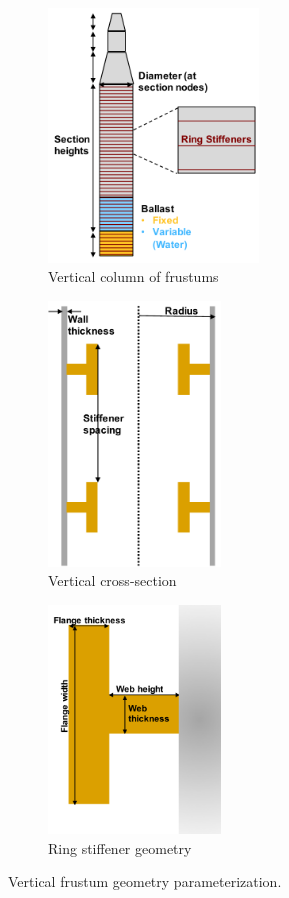 \begin{figure}[htb]
  \begin{subfigure}[b]{0.38\linewidth}
    \centering \includegraphics[width=2.2in]{figs/colGeom.pdf}
    \caption{Vertical column of frustums}
  \end{subfigure}
  \begin{subfigure}[b]{0.29\linewidth}
    \centering \includegraphics[width=1.8in]{figs/stiffenerCut.pdf}
    \caption{Vertical cross-section}
  \end{subfigure}
  \begin{subfigure}[b]{0.29\linewidth}
    \centering \includegraphics[width=1.8in]{figs/stiffenerZoom.pdf}
    \caption{Ring stiffener geometry}
  \end{subfigure}
  \caption{Vertical frustum geometry parameterization.}
  \label{fig:column}
\end{figure}


